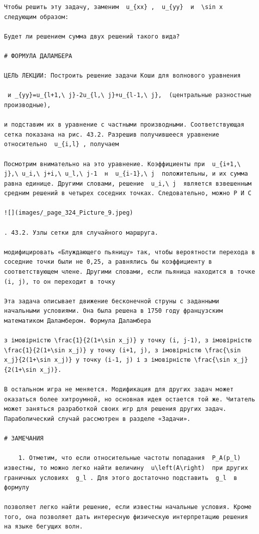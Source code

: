 \documentclass[
  ukrainian,
]{article}
\begin{document}
\begin{verbatim}
Чтобы решить эту задачу, заменим  u_{xx} ,  u_{yy}  и  \sin x  следующим образом:

Будет ли решением сумма двух решений такого вида?

# ФОРМУЛА ДАЛАМБЕРА

ЦЕЛЬ ЛЕКЦИИ: Построить решение задачи Коши для волнового уравнения

 и _{yy}=u_{l+1,\ j}-2u_{l,\ j}+u_{l-1,\ j},  (центральные разностные производные),

и подставим их в уравнение с частными производными. Соответствующая сетка показана на рис. 43.2. Разрешив получившееся уравнение относительно  u_{i,l} , получаем

Посмотрим внимательно на это уравнение. Коэффициенты при  u_{i+1,\ j},\ u_i,\ j+i,\ u_l,\ j-1  н  u_{i-1},\ j  положительны, и их сумма равна единице. Другими словами, решение  u_i,\ j  является взвешенным средним решений в четырех соседних точках. Следовательно, можно Р И С

![](images/_page_324_Picture_9.jpeg)

. 43.2. Узлы сетки для случайного маршруга.

модифицировать «Блуждающего пьяницу» так, чтобы вероятности перехода в соседние точки были не 0,25, а равнялись бы коэффициенту в соответствующем члене. Другими словами, если пьяница находится в точке (i, j), то он переходит в точку

Эта задача описывает движение бесконечной струны с заданными начальными условиями. Она была решена в 1750 году французским математиком Даламбером. Формула Даламбера

з імовірністю \frac{1}{2(1+\sin x_j)} у точку (i, j-1), з імовірністю \frac{1}{2(1+\sin x_j)} у точку (i+1, j), з імовірністю \frac{\sin x_j}{2(1+\sin x_j)} у точку (i-1, j) і з імовірністю \frac{\sin x_j}{2(1+\sin x_j)}.

В остальном игра не меняется. Модификация для других задач может оказаться более хитроумной, но основная идея остается той же. Читатель может заняться разработкой своих игр для решения других задач. Параболический случай рассмотрен в разделе «Задачи».

# ЗАМЕЧАНИЯ

    1. Отметим, что если относительные частоты попадания  P_A(p_l)  известны, то можно легко найти величину  u\left(A\right)  при других граничных условиях  g_l . Для этого достаточно подставить  g_l  в формулу

позволяет легко найти решение, если известны начальные условия. Кроме того, она позволяет дать интересную физическую интерпретацию решения на языке бегущих волн.


\end{verbatim}
\end{document}
